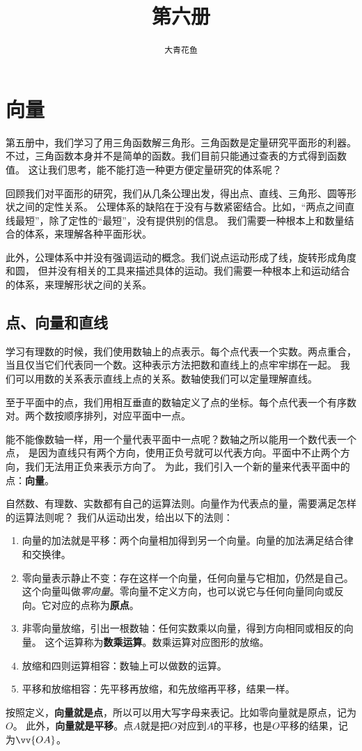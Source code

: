 \documentclass[12pt,UTF8,fontset=none]{ctexbook}
\title{\zihao{0} \bfseries 第六册}
\author{\zihao{2} \texttt{大青花鱼}}
\date{}
\begin{document}
\maketitle
\tableofcontents
\newpage

\chapter{向量}

第五册中，我们学习了用三角函数解三角形。三角函数是定量研究平面形的利器。
不过，三角函数本身并不是简单的函数。我们目前只能通过查表的方式得到函数值。
这让我们思考，能不能打造一种更方便定量研究的体系呢？ 

回顾我们对平面形的研究，我们从几条公理出发，得出点、直线、三角形、圆等形状之间的定性关系。
公理体系的缺陷在于没有与数紧密结合。比如，“两点之间直线最短”，除了定性的“最短”，没有提供别的信息。
我们需要一种根本上和数量结合的体系，来理解各种平面形状。

此外，公理体系中并没有强调运动的概念。我们说点运动形成了线，旋转形成角度和圆，
但并没有相关的工具来描述具体的运动。我们需要一种根本上和运动结合的体系，来理解形状之间的关系。

\section{点、向量和直线}
学习有理数的时候，我们使用数轴上的点表示。每个点代表一个实数。两点重合，
当且仅当它们代表同一个数。这种表示方法把数和直线上的点牢牢绑在一起。
我们可以用数的关系表示直线上点的关系。数轴使我们可以定量理解直线。

至于平面中的点，我们用相互垂直的数轴定义了点的坐标。每个点代表一个有序数对。两个数按顺序排列，对应平面中一点。

能不能像数轴一样，用一个量代表平面中一点呢？数轴之所以能用一个数代表一个点，
是因为直线只有两个方向，使用正负号就可以代表方向。平面中不止两个方向，我们无法用正负来表示方向了。
为此，我们引入一个新的量来代表平面中的点：\textbf{向量}。

自然数、有理数、实数都有自己的运算法则。向量作为代表点的量，需要满足怎样的运算法则呢？
我们从运动出发，给出以下的法则：
\begin{enumerate}
    \item 向量的加法就是平移：两个向量相加得到另一个向量。向量的加法满足结合律和交换律。
    \item 零向量表示静止不变：存在这样一个向量，任何向量与它相加，仍然是自己。
    这个向量叫做\textsl{零向量}。零向量不定义方向，也可以说它与任何向量同向或反向。它对应的点称为\textbf{原点}。
    \item 非零向量放缩，引出一根数轴：任何实数乘以向量，得到方向相同或相反的向量。
    这个运算称为\textbf{数乘运算}。数乘运算对应图形的放缩。
    \item 放缩和四则运算相容：数轴上可以做数的运算。
    \item 平移和放缩相容：先平移再放缩，和先放缩再平移，结果一样。
\end{enumerate}
按照定义，\textbf{向量就是点}，所以可以用大写字母来表记。比如零向量就是原点，记为$O$。
此外，\textbf{向量就是平移}。点$A$就是把$O$对应到$A$的平移，也是$O$平移的结果，记为$\vv{OA}$。
\end{document}
